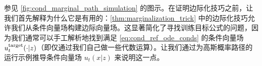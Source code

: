 参见 \cref{fig:cond_marginal_path_simulation} 的图示。在证明边际化技巧之前，让我们首先解释为什么它是有用的：\cref{thm:marginalization_trick} 中的边际化技巧允许我们从条件向量场构建边际向量场。这显著简化了寻找训练目标公式的问题，因为我们通常可以手工解析地找到满足 \cref{eq:cond_ref_ode_conds} 的条件向量场 $u^{\text{target}}_t(\cdot|z)$（即仅通过我们自己做一些代数运算）。让我们通过为高斯概率路径的运行示例推导条件向量场 $u_t(x|z)$ 来说明这一点。



